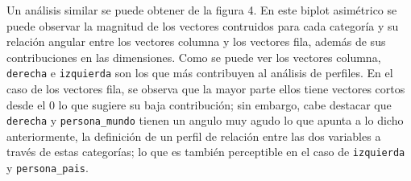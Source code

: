 \documentclass[
]{article}
\begin{document}
Un análisis similar se puede obtener de la figura 4. En este biplot
asimétrico se puede observar la magnitud de los vectores contruidos para
cada categoría y su relación angular entre los vectores columna y los
vectores fila, además de sus contribuciones en las dimensiones. Como se
puede ver los vectores columna, \texttt{derecha} e \texttt{izquierda}
son los que más contribuyen al análisis de perfiles. En el caso de los
vectores fila, se observa que la mayor parte ellos tiene vectores cortos
desde el 0 lo que sugiere su baja contribución; sin embargo, cabe
destacar que \texttt{derecha} y \texttt{persona\_mundo} tienen un angulo
muy agudo lo que apunta a lo dicho anteriormente, la definición de un
perfil de relación entre las dos variables a través de estas categorías;
lo que es también perceptible en el caso de \texttt{izquierda} y
\texttt{persona\_pais}.
\end{document}

